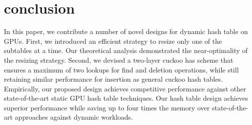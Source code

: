 \section{conclusion}\label{sec:con}
In this paper, we contribute a number of novel designs for dynamic hash table on GPUs. 
First, we introduced an efficient strategy to resize only one of the subtables at a time. Our theoretical analysis demonstrated the near-optimality of the resizing strategy. Second, we devised a two-layer cuckoo has scheme that ensures a maximum of two lookups for find and deletion operations, while still retaining similar performance for insertion as general cuckoo hash tables. 
Empirically, our proposed design achieves competitive performance against other state-of-the-art static GPU hash table techniques. Our hash table design achieves superior performance while saving up to four times the memory over state-of-the-art approaches against dynamic workloads.

 